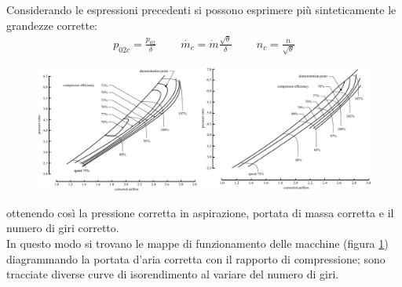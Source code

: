 Considerando le espressioni precedenti si possono esprimere più sinteticamente le grandezze corrette:
\begin{align*}
p_{02c} = \frac{p_{02}}{\delta} \;\;\;\;\;\;\;\; \dot{m_c}= \dot{m} \frac{\sqrt{\theta}}{\delta} \;\;\;\;\;\;\;\; n_c = \frac{n}{\sqrt{\theta}}
\end{align*}
\begin{figure}
\centering
  \includegraphics[width=\textwidth]{fig/CompMaps.pdf}
\caption{}
\label{fig:compMaps}
\end{figure}
ottenendo così la pressione corretta in aspirazione, portata di massa corretta e il numero di giri corretto.\\
In questo modo si trovano le mappe di funzionamento delle macchine (figura \ref{fig:compMaps}) diagrammando la portata d'aria corretta con il rapporto di compressione; sono tracciate diverse curve di isorendimento al variare del numero di giri.

